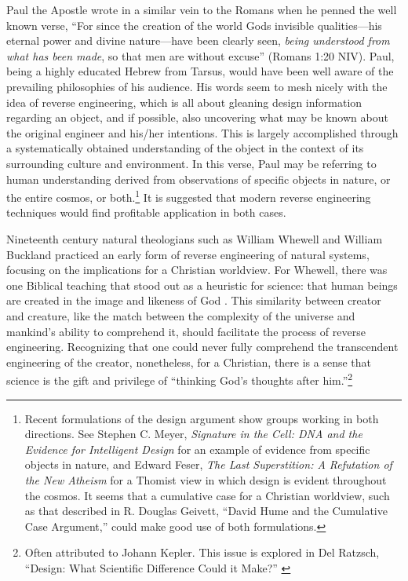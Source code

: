 Paul the Apostle wrote in a similar vein to the Romans when he penned
the well known verse, “For since the creation of the
world God{\textquotesingle}s invisible qualities---his eternal power
and divine nature---have been clearly seen,
\textit{being understood from what has been
made}, so that men are without
excuse” (Romans 1:20 NIV).
Paul, being a highly educated Hebrew from Tarsus, would have been well
aware of the prevailing philosophies of his audience. His words seem to
mesh nicely with the idea of reverse engineering, which is all about
gleaning design information regarding an object,
and if possible, also uncovering what may be
known about the original engineer and his/her
intentions. This is largely accomplished through a
systematically obtained understanding of the object in the context of
its surrounding culture and environment. In this verse, Paul may be
referring to human understanding derived from observations of specific
objects in nature, or the entire cosmos, or
both.\footnote{
Recent formulations of the design argument show
groups working in both directions. See Stephen C. Meyer,
\textit{Signature in the Cell: DNA and the Evidence for Intelligent
Design}\citep{meyer2009} for an example of evidence from
specific objects in nature, and Edward Feser, \textit{The Last
Superstition: A Refutation of the New Atheism} \citep{feser2008}
for a Thomist view in which design is evident
throughout the cosmos. It seems that a cumulative case for a Christian
worldview, such as that described in R. Douglas Geivett, “David Hume
and the Cumulative Case Argument,” \citep{geivett2005}
could make
good use of both formulations.
}
It is
suggested that modern reverse engineering techniques would find
profitable application in both cases.

Nineteenth century natural theologians such as William Whewell and
William Buckland practiced an early form of reverse engineering of
natural systems, focusing on the implications for a Christian
worldview. For Whewell, there was one Biblical teaching that stood out
as a heuristic for science: that human beings are created in the image
and likeness of God \citep[][p.~283]{fuller2006}. This similarity between
creator and creature, like the match between the complexity of the
universe and mankind’s ability to comprehend it, should facilitate the
process of reverse engineering. Recognizing that one could never fully
comprehend the transcendent engineering of the creator, nonetheless,
for a Christian, there is a sense that science is the gift and
privilege of ``thinking God’s thoughts after him.''\footnote{
Often attributed to Johann Kepler. This issue is
explored in Del Ratzsch, ``Design: What Scientific Difference Could it
Make?'' \citep{ratzsch2004}
}

